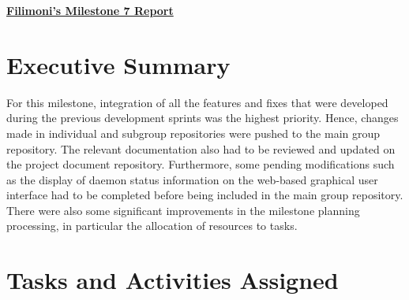 \begin{center}
{\LARGE\textbf{\underline{{Filimoni's Milestone 7 Report}}}}
\end{center}

\section*{Executive Summary}

For this milestone, integration of all the features and fixes that were developed during the previous development sprints was the highest priority. Hence, changes made in individual and subgroup repositories were pushed to the main group repository. The relevant documentation also had to be reviewed and updated on the project document repository. Furthermore, some pending modifications such as the display of daemon status information on the web-based graphical user interface had to be completed before being included in the main group repository. There were also some significant improvements in the milestone planning processing, in particular the allocation of resources to tasks.

\section*{Tasks and Activities Assigned}

